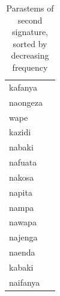 \documentclass[output=paper,colorlinks,citecolor=brown,
]{langscibook}
\begin{document}
\begin{table}
\begin{minipage}[t]{.24\textwidth}
\begin{tabular}{ll}
kafanya \\ 
naongeza \\ 
wape \\ 
kazidi \\ 
nabaki \\ 
nafuata \\ 
nakosa \\ 
napita \\ 
nampa \\ 
nawapa \\ 
najenga \\ 
naenda \\ 
kabaki \\ 
naifanya \\  
 \end{tabular}
 \end{minipage}
\lspbottomrule
 \caption{Parastems of second signature, sorted by decreasing frequency}
 \label{2ndsignatureparastems}
 \end{table}
 
\end{document}

